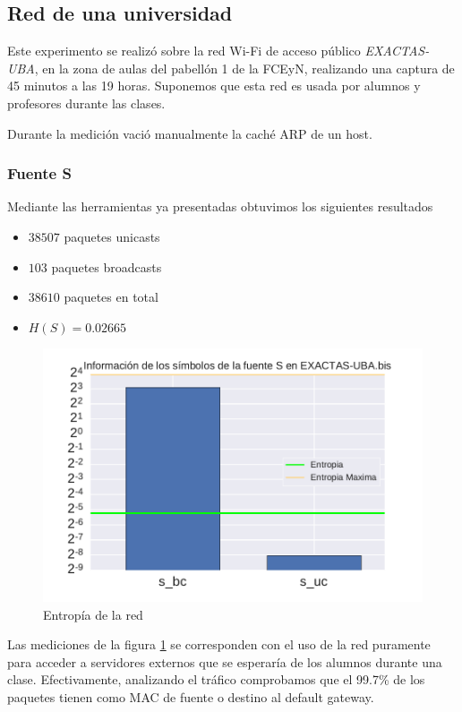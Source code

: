 
\subsection{Red de una universidad}
Este experimento se realizó sobre la red Wi-Fi de acceso público \textit{EXACTAS-UBA}, en la zona de aulas del pabellón 1 de la FCEyN, realizando una captura de 45 minutos a las 19 horas.
Suponemos que esta red es usada por alumnos y profesores durante las clases.

Durante la medición vació manualmente la caché ARP de un host.

\subsubsection{Fuente S}

Mediante las herramientas ya presentadas obtuvimos los siguientes resultados
\begin{itemize}
 \item $38507$ paquetes unicasts
 \item $103$ paquetes broadcasts
 \item $38610$ paquetes en total
 \item $H(S) = 0.02665$
\end{itemize}

\begin{figure}[H]
   \centering
       \includegraphics[page=1,width=.70\textwidth]{../img/barras-EXACTAS-UBA-bis}
 \caption{Entropía de la red}
 \label{fig:barras-exactas}
\end{figure}

Las mediciones de la figura \ref{fig:barras-exactas} se corresponden con el uso de la red puramente para acceder a servidores externos que se esperaría de los alumnos durante una clase.
Efectivamente, analizando el tráfico comprobamos que el 99.7\% de los paquetes tienen como MAC de fuente o destino al default gateway.

